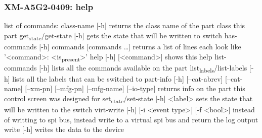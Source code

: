 \documentclass[11pt]{article}
\begin{document}
\subsubsection{XM-A5G2-0409: help}
\label{sec:orga2754c5}
list of commands:
  class-name [-h]
    returns the class name of the part class this part
  get\textsubscript{state}/get-state [-h]
    gets the state that will be written to switch
  has-commands [-h] commands [commands \ldots{}]
    returns a list of lines each look like '<command>: <is\textsubscript{present}>'
  help [-h] [<command>]
    shows this help
  list-commands [-h]
    lists all the commands available on the part
  list\textsubscript{labels}/list-labels [-h]
    lists all the labels that can be switched to
  part-info  [-h] [--cat-abrev] [--cat-name] [--xm-pn] [--mfg-pn] [--mfg-name]
          [--io-type]
    returns info on the part this control screen was designed for
  set\textsubscript{state}/set-state [-h] <label>
    sets the state that will be written to the switch
  virt-write [-h] [-i <event type>] [-f <bool>]
    instead of writting to spi bus, instead write to a virtual spi bus
    and return the log output
  write [-h]
    writes the data to the device
\end{document}
